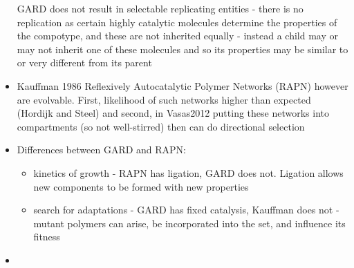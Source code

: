 \begin{itemize}
			GARD does not result in selectable replicating entities - there is no
			replication as certain highly catalytic molecules determine the
			properties of the compotype, and these are not inherited equally -
			instead a child may or may not inherit one of these molecules and so
			its properties may be similar to or very different from its parent
			
			\item
			
			Kauffman 1986 Reflexively Autocatalytic Polymer Networks (RAPN) however are
			evolvable. First, likelihood of such networks higher than expected
			(Hordijk and Steel) and second, in Vasas2012 putting these networks
			into compartments (so not well-stirred) then can do directional
			selection
			
			\item
			
			Differences between GARD and RAPN:
				
			\begin{itemize}
				\item
				
				kinetics of growth - RAPN has ligation, GARD does not. Ligation
				allows new components to be formed with new properties
				
				\item
				
				search for adaptations - GARD has fixed catalysis, Kauffman does not
				- mutant polymers can arise, be incorporated into the set, and
				influence its fitness
				
			\end{itemize}
			\item
			
		\end{itemize}
